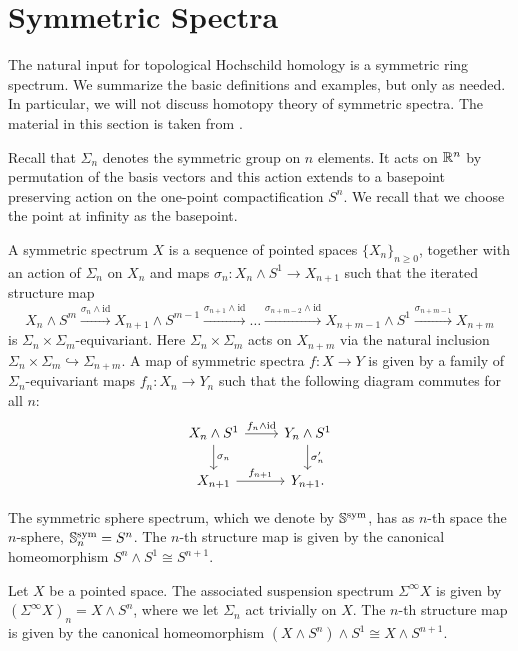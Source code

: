 \section{Symmetric Spectra}
The natural input for topological Hochschild homology is a symmetric ring spectrum.
We summarize the basic definitions and examples, but only as needed. In particular,
we will not discuss homotopy theory of symmetric spectra. The material in this
section is taken from \cite{hsssymmetricspectra}.

Recall that $\Sigma_n$ denotes the symmetric group on $n$ elements. It acts on $\mathbb{R}^n$
by permutation of the basis vectors and this action extends to a basepoint preserving action
on the one-point compactification $S^n$. We recall that we choose the point at infinity as the basepoint.
\begin{mydef}
A symmetric spectrum $X$ is a sequence of pointed spaces $\{X_n\}_{n\ge 0}$, together with an action
of $\Sigma_n$ on $X_n$ and maps $\sigma_n:X_n\wedge S^1\rightarrow X_{n+1}$ such that 
the iterated structure map
\[
X_n\wedge S^m\xrightarrow{\sigma_n\wedge\mathrm{id}} X_{n+1}\wedge S^{m-1}
\xrightarrow{\sigma_{n+1}\wedge \mathrm{id}}\ldots \xrightarrow{\sigma_{n+m-2}\wedge\mathrm{id}} 
X_{n+m-1}\wedge S^1\xrightarrow{\sigma_{n+m-1}}
X_{n+m}
\]
is $\Sigma_n\times \Sigma_m$-equivariant. Here $\Sigma_n\times \Sigma_m$
acts on $X_{n+m}$ via the natural inclusion $\Sigma_n\times \Sigma_m\hookrightarrow \Sigma_{n+m}$.
A map of symmetric spectra $f:X\to Y$ is given by a family of 
$\Sigma_n$-equivariant maps $f_n:X_n\to Y_n$
such that the following diagram commutes for all $n$:
\[
\begin{tikzcd}
X_n\wedge S^1
\arrow{r}{f_n\wedge \mathrm{id}}\arrow{d}{\sigma_n}
&Y_n\wedge S^1
\arrow{d}{\sigma'_n}\\
X_{n+1}\arrow{r}{f_{n+1}}
&Y_{n+1}.
\end{tikzcd}
\]
\end{mydef}

\begin{bsp}
The symmetric sphere spectrum, which we denote by $\mathbb{S}^{\mathrm{sym}}$,
has as $n$-th space the $n$-sphere, $\mathbb{S}^{\mathrm{sym}}_n = S^n$.
The $n$-th structure map is given by the canonical homeomorphism $S^n\wedge S^1\cong S^{n+1}$.
\end{bsp}

\begin{bsp}
Let $X$ be a pointed space. The associated suspension spectrum $\Sigma^\infty X$ is given
by $(\Sigma^\infty X)_n= X\wedge S^n$, where we let $\Sigma_n$ act trivially on $X$.
The $n$-th structure map is given by the canonical homeomorphism
$(X\wedge S^n)\wedge S^1\cong X\wedge S^{n+1}$.
\end{bsp}


